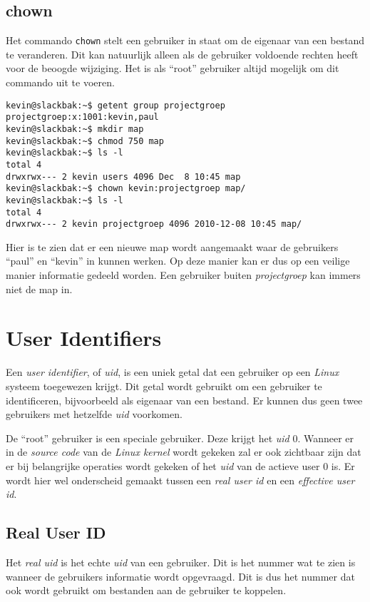 \subsection{chown}
Het commando \texttt{chown} stelt een gebruiker in staat om de eigenaar van een bestand te veranderen. Dit kan natuurlijk alleen als de gebruiker voldoende rechten heeft voor de beoogde wijziging. Het is als ``root'' gebruiker altijd mogelijk om dit commando uit te voeren. 
\begin{lstlisting}
kevin@slackbak:~$ getent group projectgroep
projectgroep:x:1001:kevin,paul
kevin@slackbak:~$ mkdir map
kevin@slackbak:~$ chmod 750 map
kevin@slackbak:~$ ls -l
total 4
drwxrwx--- 2 kevin users 4096 Dec  8 10:45 map
kevin@slackbak:~$ chown kevin:projectgroep map/
kevin@slackbak:~$ ls -l
total 4
drwxrwx--- 2 kevin projectgroep 4096 2010-12-08 10:45 map/
\end{lstlisting}
Hier is te zien dat er een nieuwe map wordt aangemaakt waar de gebruikers ``paul'' en ``kevin'' in kunnen werken. Op deze manier kan er dus op een veilige manier informatie gedeeld worden. Een gebruiker buiten \emph{projectgroep} kan immers niet de map in. 

\section{User Identifiers}
Een \emph{user identifier}, of \emph{uid}, is een uniek getal dat een gebruiker op een \emph{Linux} systeem toegewezen krijgt. Dit getal wordt gebruikt om een gebruiker te identificeren, bijvoorbeeld als eigenaar van een bestand. Er kunnen dus geen twee gebruikers met hetzelfde \emph{uid} voorkomen. 

De ``root'' gebruiker is een speciale gebruiker. Deze krijgt het \emph{uid} 0. Wanneer er in de \emph{source code} van de \emph{Linux kernel} wordt gekeken zal er ook zichtbaar zijn dat er bij belangrijke operaties wordt gekeken of het \emph{uid} van de actieve user 0 is. Er wordt hier wel onderscheid gemaakt tussen een \emph{real user id} en een \emph{effective user id}. 

\subsection{Real User ID}
Het \emph{real uid} is het echte \emph{uid} van een gebruiker. Dit is het nummer wat te zien is wanneer de gebruikers informatie wordt opgevraagd. Dit is dus het nummer dat ook wordt gebruikt om bestanden aan de gebruiker te koppelen. 

